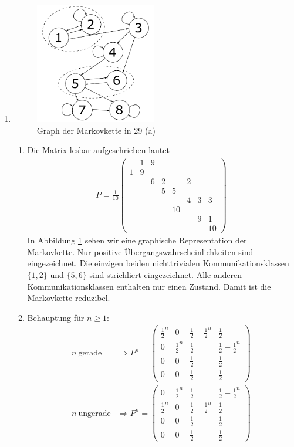 \documentclass[a4paper,11pt,notitlepage,fullpage]{article}
\begin{document}
\begin{enumerate}
\item
\begin{figure}[h!]
\centering
\includegraphics[width=0.5\textwidth]{gfx/29_a.pdf}
\caption{\label{fig:graph} Graph der Markovkette in 29 (a)}
\end{figure}

\begin{enumerate}
\item Die Matrix lesbar aufgeschrieben lautet
\begin{align*}
P = \frac{1}{10}\begin{pmatrix}
&1&9&&&&&\\
1&9&&&&&&\\
&&6&2&&2&&\\
&&&5&5&&&\\
&&&&&4&3&3\\
&&&&10&&&\\
&&&&&&9&1\\
&&&&&&&10
\end{pmatrix}
\end{align*}
In Abbildung \ref{fig:graph} sehen wir eine graphische Representation der Markovkette. Nur positive Übergangswahrscheinlichkeiten sind eingezeichnet. Die einzigen beiden nichttrivialen Kommunikationsklassen $\{1, 2\}$ und $\{5,6\}$ sind strichliert eingezeichnet. Alle anderen Kommunikationsklassen enthalten nur einen Zustand. Damit ist die Markovkette reduzibel.
\item Behauptung für $n \geq 1$:
\begin{align*}
n~\text{gerade} &\Rightarrow P^n = \begin{pmatrix}
\frac{1}{2}^n&0&\frac{1}{2}-\frac{1}{2}^n&\frac{1}{2} \\
0&\frac{1}{2}^n&\frac{1}{2}&\frac{1}{2}-\frac{1}{2}^n \\
0&0&\frac{1}{2}&\frac{1}{2}\\
0&0&\frac{1}{2}&\frac{1}{2}
\end{pmatrix} \\
n~\text{ungerade} &\Rightarrow P^n = \begin{pmatrix}
0&\frac{1}{2}^n&\frac{1}{2}&\frac{1}{2}-\frac{1}{2}^n \\
\frac{1}{2}^n&0&\frac{1}{2}-\frac{1}{2}^n&\frac{1}{2} \\
0&0&\frac{1}{2}&\frac{1}{2}\\
0&0&\frac{1}{2}&\frac{1}{2}
\end{pmatrix} 
\end{align*}


\end{enumerate}
\end{enumerate}
\end{document}
